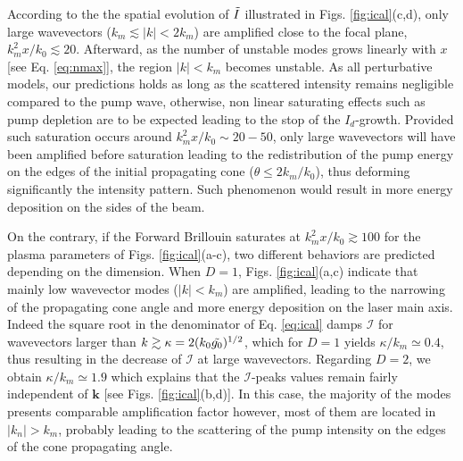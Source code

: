 \documentclass[
 reprint,
 amsmath,amssymb,
 aps,
]{revtex4-1}
\begin{document}
According to the the spatial evolution of $\Tilde{I}$ illustrated in Figs. \ref{fig:ical}(c,d), only large wavevectors ($k_m\lesssim \vert k\vert<2k_m$) are amplified close to the focal plane, $k_m^2x/k_0\lesssim 20$. Afterward, as the number of unstable modes grows linearly with $x$ [see Eq. \eqref{eq:nmax}],   the region  $\vert k\vert<k_m$ becomes unstable. As all perturbative models, our predictions holds as long as the scattered intensity remains negligible compared to the pump wave, otherwise, non linear saturating effects such as pump depletion are to be expected leading to the stop of the $I_d$-growth. Provided such saturation occurs around $k_m^2 x/k_0\sim 20-50$, only large wavevectors will have been amplified before saturation leading to the redistribution of the pump energy on the edges of the initial propagating cone ($\theta\le  2k_m/k_0$), thus deforming significantly  the intensity pattern. Such phenomenon would result in more energy deposition on the sides of the beam. 

On the contrary, if the Forward Brillouin saturates at $k_m^2x/k_0\gtrsim 100$ for the plasma parameters of  Figs. \ref{fig:ical}(a-c), two different behaviors are predicted depending on the dimension. When $D=1$, Figs. \ref{fig:ical}(a,c) indicate that mainly low wavevector modes ($\vert k\vert<k_m$) are amplified, leading to the narrowing of the propagating cone angle and more energy deposition on the laser main axis.
Indeed the square root in the denominator of Eq. \eqref{eq:ical} damps $\mathcal{I}$ for wavevectors larger than $k\gtrsim \kappa = 2(k_0\Tilde{g_0})^{1/2}$, which for  $D=1$ yields $\kappa/k_m \simeq 0.4 $, thus resulting in the decrease of $\mathcal{I}$ at large wavevectors. Regarding  $D=2$, we obtain $\kappa/k_m \simeq 1.9 $ which explains that the $\mathcal{I}$-peaks  values remain fairly independent of $\mathbf{k}$ [see Figs. \ref{fig:ical}(b,d)]. In this case, the majority of the modes presents comparable amplification factor however,  most of them are located in $\vert k_n\vert >k_m$, probably leading to the scattering of the pump intensity on the edges of the cone propagating angle.
\end{document}
